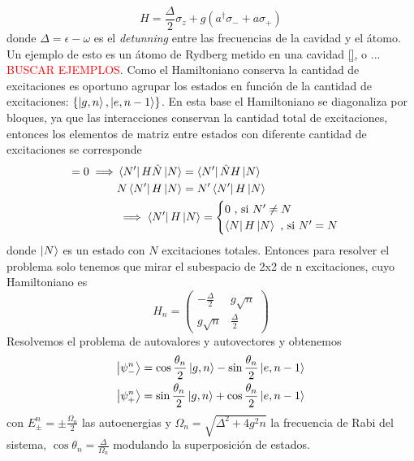 \begin{equation}\label{eq3:hamiltoniano jcm}
    H=\frac{\Delta}{2}\sigma_z+g(a^\dagger \sigma_-+a \sigma_+)
\end{equation}
donde $\Delta = \epsilon - \omega$ es el \textit{detunning} entre las frecuencias de la cavidad y el átomo. Un ejemplo de esto es un átomo de Rydberg metido en una cavidad \ref{}, o ... \textcolor{red}{BUSCAR EJEMPLOS}.
Como el Hamiltoniano conserva la cantidad de excitaciones es oportuno agrupar los estados en funci\'on de la cantidad de excitaciones: $\{\ket{g,n},\ket{e,n-1}\}$. En esta base el Hamiltoniano se diagonaliza por bloques, ya que las interacciones conservan la cantidad total de excitaciones, entonces los elementos de matriz entre estados con diferente cantidad de excitaciones se corresponde
\begin{align*}
    [H,\hat N]=0 \implies & \bra{N'}H \hat N \ket{N} = \bra{N'}\hat N H \ket{N} \\
    & N \bra{N'}H  \ket{N} = N' \bra{N'}H \ket{N} \\
    & \implies \bra{N'}H \ket{N} = \begin{cases}
        0 \text{ , si } N' \neq N \\
        \bra{N}H \ket{N} \text{ , si } N'=N
    \end{cases}
\end{align*}
donde $\ket{N}$ es un estado con $N$ excitaciones totales. Entonces para resolver el problema solo tenemos que mirar el subespacio de 2x2 de n excitaciones, cuyo Hamiltoniano es
\begin{equation}
    H_n=\begin{pmatrix}
        -\frac{\Delta}{2} & g \sqrt{n} \\
        g \sqrt{n} & \frac{\Delta}{2} 
    \end{pmatrix}
\end{equation}
Resolvemos el problema de autovalores y autovectores y obtenemos
\begin{equation}
    \begin{aligned}
        \ket{\psi^n_-} & = \cos \frac{\theta_n}{2}\ket{g,n}-\sin \frac{\theta_n}{2}\ket{e,n-1} \\
        \ket{\psi^n_+} & = \sin \frac{\theta_n}{2}\ket{g,n}+\cos \frac{\theta_n}{2}\ket{e,n-1}        
    \end{aligned}
\end{equation}
con $E_{\pm}^n=\pm \frac{\Omega_n}{2}$ las autoenergias y $\Omega_n=\sqrt{\Delta^2+4g^2n}$ la frecuencia de Rabi del sistema, $\cos \theta_n=\frac{\Delta}{\Omega_n}$ modulando la superposici\'on de estados. 
